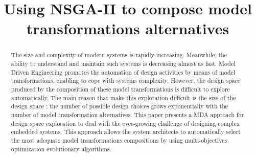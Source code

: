 \documentclass[conference]{IEEEtran}
\begin{document}
\title{Using NSGA-II to compose model transformations alternatives }

 \author{



}

\maketitle

\begin{abstract}
The size and complexity of modern systems is rapidly increasing. Meanwhile, the ability to understand and maintain such systems is decreasing almost as fast.
Model Driven Engineering promotes the automation of design activities by means of model transformations, enabling to cope with systems complexity. However, the design space produced by the composition of these model transformations is difficult to explore automatically. The main reason that make this exploration difficult is the size of the design space : the number of possible design choices grows exponentially with the number of model transformation alternatives.
This paper presents a MDA approach for design space exploration to deal with the ever-growing challenge of designing complex embedded systems. This approach allows the system architects to automatically select the most adequate model transformations compositions by using multi-objectives optimization evolutionary algorithms.

\end{abstract}
\end{document}
